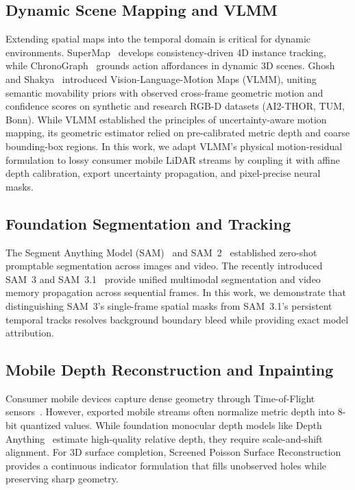 \documentclass[conference]{IEEEtran}
\begin{document}
\subsection{Dynamic Scene Mapping and VLMM}
Extending spatial maps into the temporal domain is critical for dynamic environments. SuperMap~\cite{supermap2026} develops consistency-driven 4D instance tracking, while ChronoGraph~\cite{chronograph2026} grounds action affordances in dynamic 3D scenes. Ghosh and Shakya~\cite{vlmm2026} introduced Vision-Language-Motion Maps (VLMM), uniting semantic movability priors with observed cross-frame geometric motion and confidence scores on synthetic and research RGB-D datasets (AI2-THOR, TUM, Bonn). While VLMM established the principles of uncertainty-aware motion mapping, its geometric estimator relied on pre-calibrated metric depth and coarse bounding-box regions. In this work, we adapt VLMM's physical motion-residual formulation to lossy consumer mobile LiDAR streams by coupling it with affine depth calibration, export uncertainty propagation, and pixel-precise neural masks.

\subsection{Foundation Segmentation and Tracking}
The Segment Anything Model (SAM)~\cite{kirillov2023sam} and SAM~2~\cite{ravi2024sam2} established zero-shot promptable segmentation across images and video. The recently introduced SAM~3 and SAM~3.1~\cite{meta2025sam3} provide unified multimodal segmentation and video memory propagation across sequential frames. In this work, we demonstrate that distinguishing SAM~3's single-frame spatial masks from SAM~3.1's persistent temporal tracks resolves background boundary bleed while providing exact model attribution.

\subsection{Mobile Depth Reconstruction and Inpainting}
Consumer mobile devices capture dense geometry through Time-of-Flight sensors~\cite{apple2020arkit}. However, exported mobile streams often normalize metric depth into 8-bit quantized values. While foundation monocular depth models like Depth Anything~\cite{yang2024depthanything} estimate high-quality relative depth, they require scale-and-shift alignment. For 3D surface completion, Screened Poisson Surface Reconstruction~\cite{kazhdan2013screened} provides a continuous indicator formulation that fills unobserved holes while preserving sharp geometry.
\end{document}
